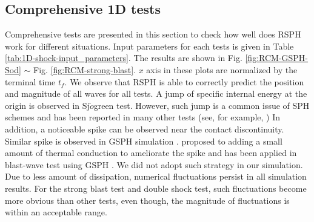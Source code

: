 \documentclass[review]{elsarticle}
\begin{document}
\subsection{Comprehensive 1D tests} \label{sec:comprehensive-1d-tests}
Comprehensive tests are presented in this section to check how well does RSPH work for different situations. Input parameters for each tests is given in Table \ref{tab:1D-shock-input_parameters}.
The results are shown in Fig. \ref{fig:RCM-GSPH-Sod} $\sim$ Fig. \ref{fig:RCM-strong-blast}. $x$ axis in these plots are normalized by the terminal time $t_f$. We observe that RSPH is able to correctly predict the position and magnitude of all waves for all tests. A jump of specific internal energy at the origin is observed in Sj$\ddot{o}$green test. However, such jump is a common issue of SPH schemes and has been reported in many other tests (see, for example, \citep{monaghan1997sph,cha2003implementations,puri2014approximate})
In addition, a noticeable spike can be observed near the contact discontinuity. Similar spike is observed in GSPH simulation \citep{puri2014comparison}. %
\citet{noh1987errors} proposed to adding a small amount of thermal conduction to ameliorate the spike and has been applied in blast-wave test using GSPH \citep{puri2014comparison}. We did not adopt such strategy in our simulation.
Due to less amount of dissipation, numerical fluctuations persist in all simulation results. For the strong blast test and double shock test, such fluctuations become more obvious than other tests, even though, the magnitude of fluctuations is within an acceptable range.
\end{document}
